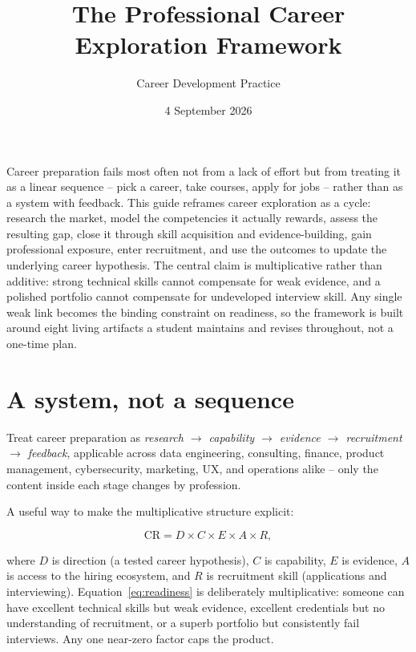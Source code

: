 \documentclass{reportkit}
\title{The Professional Career Exploration Framework}
\author{Career Development Practice}
\date{4 September 2026}
\begin{document}
\maketitle

\begin{execsummary}
Career preparation fails most often not from a lack of effort but from treating it as
a linear sequence -- pick a career, take courses, apply for jobs -- rather than as a
system with feedback. This guide reframes career exploration as a cycle: research the
market, model the competencies it actually rewards, assess the resulting gap,
close it through skill acquisition and evidence-building, gain professional exposure,
enter recruitment, and use the outcomes to update the underlying career hypothesis.
The central claim is multiplicative rather than additive: strong technical skills
cannot compensate for weak evidence, and a polished portfolio cannot compensate for
undeveloped interview skill. Any single weak link becomes the binding constraint on
readiness, so the framework is built around eight living artifacts a student
maintains and revises throughout, not a one-time plan.
\end{execsummary}

\section{A system, not a sequence}
Treat career preparation as \emph{research $\to$ capability $\to$ evidence $\to$
recruitment $\to$ feedback}, applicable across data engineering, consulting, finance,
product management, cybersecurity, marketing, UX, and operations alike -- only the
content inside each stage changes by profession.

A useful way to make the multiplicative structure explicit:

\begin{equation}
  \mathrm{CR} = D \times C \times E \times A \times R,
  \label{eq:readiness}
\end{equation}

where $D$ is direction (a tested career hypothesis), $C$ is capability, $E$ is
evidence, $A$ is access to the hiring ecosystem, and $R$ is recruitment skill
(applications and interviewing). Equation~\ref{eq:readiness} is deliberately
multiplicative: someone can have excellent technical skills but weak evidence,
excellent credentials but no understanding of recruitment, or a superb portfolio but
consistently fail interviews. Any one near-zero factor caps the product.
\end{document}
